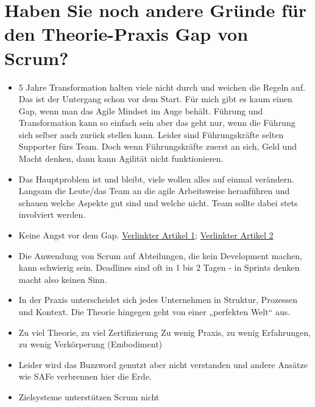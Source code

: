 \section*{Haben Sie noch andere Gründe für den Theorie-Praxis Gap von Scrum?}
\begin{itemize}
    \item[\openresponse] 5 Jahre Transformation halten viele nicht durch und weichen die Regeln auf. Das ist der Untergang schon vor dem Start. Für mich gibt es kaum einen Gap, wenn man das Agile Mindset im Auge behält. Führung und Transformation kann so einfach sein aber das geht nur, wenn die Führung sich selber auch zurück stellen kann. Leider sind Führungskräfte selten Supporter fürs Team. Doch wenn Führungskräfte zuerst an sich, Geld und Macht denken, dann kann Agilität nicht funktionieren.
    \item[\openresponse] Das Hauptproblem ist und bleibt, viele wollen alles auf einmal verändern. Langsam die Leute/das Team an die agile Arbeitsweise heranführen und schauen welche Aspekte gut sind und welche nicht. Team sollte dabei stets involviert werden.
    \item[\openresponse] Keine Angst vor dem Gap. \href{https://german-iod.org/blog/2019/08/07/newwork-rueckbau-des-sicherheitsnetzes/}{Verlinkter Artikel 1}; \href{https://german-iod.org/blog/2019/02/25/ueber-agiles-micromanagement/}{Verlinkter Artikel 2}
    \item[\openresponse] Die Anwendung von Scrum auf Abteilungen, die kein Development machen, kann schwierig sein. Deadlines sind oft in 1 bis 2 Tagen - in Sprints denken macht also keinen Sinn.
    \item[\openresponse] In der Praxis unterscheidet sich jedes Unternehmen in Struktur, Prozessen und Kontext. Die Theorie hingegen geht von einer „perfekten Welt“ aus.
    \item[\openresponse] Zu viel Theorie, zu viel Zertifizierung Zu wenig Praxis, zu wenig Erfahrungen, zu wenig Verkörperung (Embodiment)
    \item[\openresponse] Leider wird das Buzzword genutzt aber nicht verstanden und andere Ansätze wie SAFe verbrennen hier die Erde.
    \item[\openresponse] Zielsysteme unterstützen Scrum nicht
\end{itemize}

\newpage

